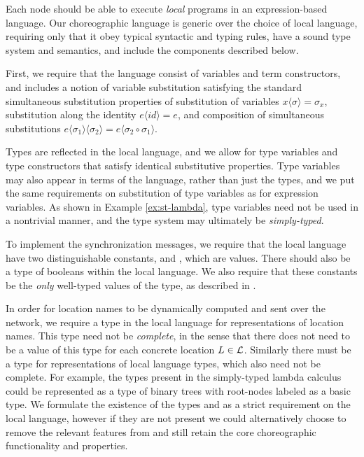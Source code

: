 Each node should be able to execute \emph{local} programs in an expression-based language.
Our choreographic language is generic over the choice of local language, requiring only that it obey typical syntactic and typing rules, have a sound type system and semantics, and include the components described below.

First, we require that the language consist of variables and term constructors, and includes a notion of variable substitution satisfying the standard simultaneous substitution properties of substitution of variables $x \langle \sigma \rangle = \sigma_x$, substitution along the identity $e \langle  id \rangle = e$, and composition of simultaneous substitutions $e \langle \sigma_1 \rangle \langle \sigma_2 \rangle = e \langle \sigma_2 \circ \sigma_1 \rangle$.

Types are reflected in the local language, and we allow for type variables and type constructors that satisfy identical substitutive properties.
Type variables may also appear in terms of the language, rather than just the types, and we put the same requirements on substitution of type variables as for expression variables.
As shown in Example \ref{ex:st-lambda}, type variables need not be used in a nontrivial manner, and the type system may ultimately be \emph{simply-typed}.

To implement the synchronization messages, we require that the local language have two distinguishable constants, \True and \False, which are values.
There should also be a type \Bool of booleans within the local language.
We also require that these constants be the \emph{only} well-typed values of the \Bool type, as described in \todo.

In order for location names to be dynamically computed and sent over the network, we require a type \Loc in the local language for representations of location names.
This type need not be \emph{complete}, in the sense that there does not need to be a value of this type for each concrete location $L \in \mathcal{L}$.
Similarly there must be a type \Typ for representations of local language types, which also need not be complete.
For example, the types present in the simply-typed lambda calculus could be represented as a type of binary trees with root-nodes labeled as a basic type.
We formulate the existence of the types \Loc and \Typ as a strict requirement on the local language, however if they are not present we could alternatively choose to remove the relevant features from \langname and still retain the core choreographic functionality and properties.

